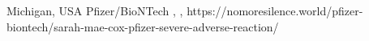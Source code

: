           {
            Michigan, USA
          }
          {
          }
          {
            Pfizer/BioNTech
          }
          {
            ,
          }
          {
            ,
          }
          {
            https://nomoresilence.world/pfizer-biontech/sarah-mae-cox-pfizer-severe-adverse-reaction/
          }


